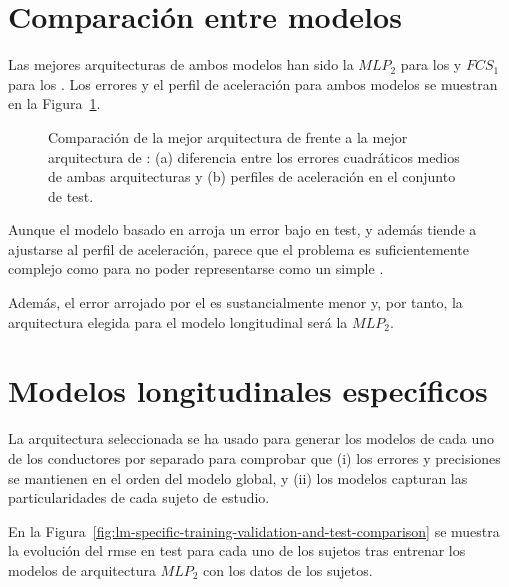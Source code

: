 \section{Comparación entre modelos}

Las mejores arquitecturas de ambos modelos han sido la $MLP_2$ para los  y $FCS_1$ para los . Los errores y el perfil de aceleración para ambos modelos se muestran en la Figura~\ref{fig:cf-comparison-between-best-mlp-and-fcs-architecture}.

\begin{figure}
	\centering
	\qquad
	\caption[Comparación entre los dos tipos de modelo longitudinal]{Comparación de la mejor arquitectura de  frente a la mejor arquitectura de : (a) diferencia entre los errores cuadráticos medios de ambas arquitecturas y (b) perfiles de aceleración en el conjunto de test.}
	\label{fig:cf-comparison-between-best-mlp-and-fcs-architecture}
\end{figure}

Aunque el modelo basado en  arroja un error bajo en test, y además tiende a ajustarse al perfil de aceleración, parece que el problema es suficientemente complejo como para no poder representarse como un simple .

Además, el error arrojado por el  es sustancialmente menor y, por tanto, la arquitectura elegida para el modelo longitudinal será la $MLP_2$.

\section{Modelos longitudinales específicos}

La arquitectura seleccionada se ha usado para generar los modelos de cada uno de los conductores por separado para comprobar que (i) los errores y precisiones se mantienen en el orden del modelo global, y (ii) los modelos capturan las particularidades de cada sujeto de estudio.

En la Figura~\ref{fig:lm-specific-training-validation-and-test-comparison} se muestra la evolución del \gls{rmse} en test para cada uno de los sujetos tras entrenar los modelos de arquitectura $MLP_2$ con los datos de los sujetos.

